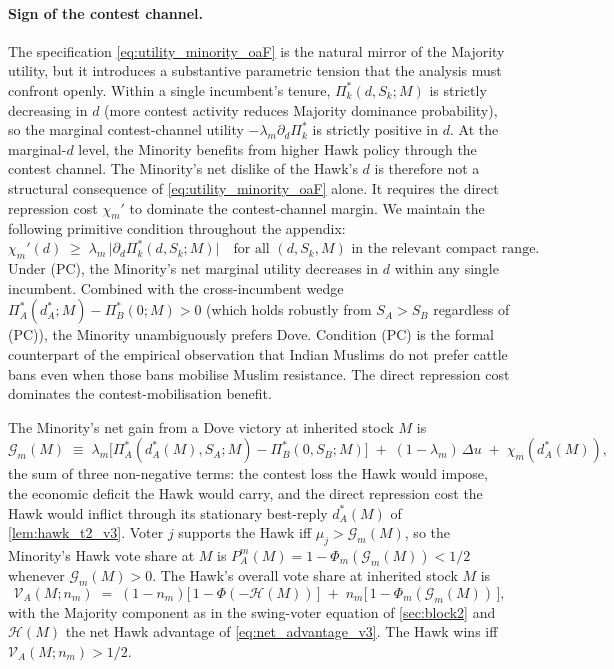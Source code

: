 \documentclass[11pt,twoside]{extarticle}
\begin{document}
\paragraph{Sign of the contest channel.} The specification \autoref{eq:utility_minority_oaF} is the natural mirror of the Majority utility, but it introduces a substantive parametric tension that the analysis must confront openly. Within a single incumbent's tenure, $\Pi_k^*(d,S_k;M)$ is strictly decreasing in $d$ (more contest activity reduces Majority dominance probability), so the marginal contest-channel utility $-\lambda_m\partial_d\Pi_k^*$ is strictly positive in $d$. At the marginal-$d$ level, the Minority benefits from higher Hawk policy through the contest channel. The Minority's net dislike of the Hawk's $d$ is therefore not a structural consequence of \autoref{eq:utility_minority_oaF} alone. It requires the direct repression cost $\chi_m'$ to dominate the contest-channel margin. We maintain the following primitive condition throughout the appendix:
\begin{equation}\label{eq:PC_oaF}
    \chi_m'(d)\;\ge\;\lambda_m\,\big|\partial_d\Pi_k^*(d,S_k;M)\big|\quad\text{for all }(d,S_k,M)\text{ in the relevant compact range.}\tag{PC}
\end{equation}
Under (PC), the Minority's net marginal utility decreases in $d$ within any single incumbent. Combined with the cross-incumbent wedge $\Pi_A^*(d_A^*;M)-\Pi_B^*(0;M)>0$ (which holds robustly from $S_A>S_B$ regardless of (PC)), the Minority unambiguously prefers Dove. Condition (PC) is the formal counterpart of the empirical observation that Indian Muslims do not prefer cattle bans even when those bans mobilise Muslim resistance. The direct repression cost dominates the contest-mobilisation benefit.

The Minority's net gain from a Dove victory at inherited stock $M$ is
\begin{equation}\label{eq:Gm_oaF}
    \mathcal G_m(M)\;\equiv\;\lambda_m\big[\Pi_A^*(d_A^*(M),S_A;M)-\Pi_B^*(0,S_B;M)\big]\;+\;(1-\lambda_m)\,\Delta u\;+\;\chi_m(d_A^*(M)),
\end{equation}
the sum of three non-negative terms: the contest loss the Hawk would impose, the economic deficit the Hawk would carry, and the direct repression cost the Hawk would inflict through its stationary best-reply $d_A^*(M)$ of \autoref{lem:hawk_t2_v3}. Voter $j$ supports the Hawk iff $\mu_j>\mathcal G_m(M)$, so the Minority's Hawk vote share at $M$ is $P_A^m(M)=1-\Phi_m(\mathcal G_m(M))<1/2$ whenever $\mathcal G_m(M)>0$. The Hawk's overall vote share at inherited stock $M$ is
\begin{equation}\label{eq:VA_oaF}
    \mathcal V_A(M;n_m)\;=\;(1-n_m)\big[\,1-\Phi(-\mathcal H(M))\,\big]\;+\;n_m\big[\,1-\Phi_m(\mathcal G_m(M))\,\big],
\end{equation}
with the Majority component as in the swing-voter equation of \autoref{sec:block2} and $\mathcal H(M)$ the net Hawk advantage of \autoref{eq:net_advantage_v3}. The Hawk wins iff $\mathcal V_A(M;n_m)>1/2$.
\end{document}
